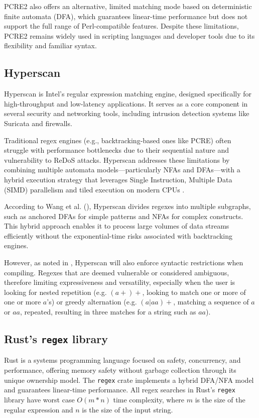 PCRE2 also offers an alternative, limited matching mode based on deterministic finite automata (DFA), which guarantees linear-time performance but does not support the full range of Perl-compatible features. Despite these limitations, PCRE2 remains widely used in scripting languages and developer tools due to its flexibility and familiar syntax. \cite{sw_pcre2}

\subsection{Hyperscan}
Hyperscan is Intel’s regular expression matching engine, designed specifically for high-throughput and low-latency applications. It serves as a core component in several security and networking tools, including intrusion detection systems like Suricata and firewalls.

Traditional regex engines (e.g., backtracking-based ones like PCRE) often struggle with performance bottlenecks due to their sequential nature and vulnerability to ReDoS attacks. Hyperscan addresses these limitations by combining multiple automata models—particularly NFAs and DFAs—with a hybrid execution strategy that leverages Single Instruction, Multiple Data (SIMD) parallelism and tiled execution on modern CPUs .

According to Wang et al. (\cite{hyperscan}), Hyperscan divides regexes into multiple subgraphs, such as anchored DFAs for simple patterns and NFAs for complex constructs. This hybrid approach enables it to process large volumes of data streams efficiently without the exponential-time risks associated with backtracking engines.

However, as noted in \cite{hyperscan}, Hyperscan will also enforce syntactic restrictions when compiling. Regexes that are deemed vulnerable or considered ambiguous, therefore limiting expressiveness and versatility, especially when the user is looking for nested repetition (e.g. $(a+)+$, looking to match one or more of one or more $a$'s) or greedy alternation (e.g. $(a|aa)+$, matching a sequence of $a$ or $aa$, repeated, resulting in three matches for a string such as $aa$).

\subsection{Rust's \texttt{regex} library}
Rust is a systems programming language focused on safety, concurrency, and performance, offering memory safety without garbage collection through its unique ownership model. The \texttt{regex} crate implements a hybrid DFA/NFA model and guarantees linear-time performance. All regex searches in Rust's \texttt{regex} library have worst case $O(m * n)$ time complexity, where $m$ is the size of the regular expression and $n$ is the size of the input string. \cite{sw_rustregex}

